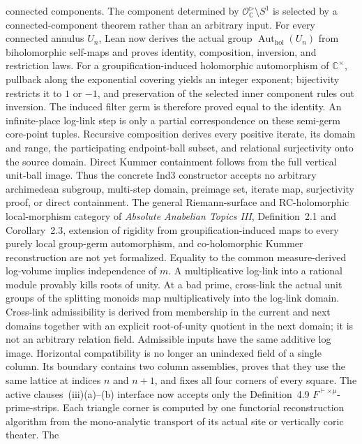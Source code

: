 \begin{definition}
  connected components.  The component determined by
  \(\mathcal O^{\triangleright}_{\mathbb C}\setminus S^1\) is selected by a
  connected-component theorem rather than an arbitrary input.  For every
  connected annulus \(U_n\), Lean now derives the actual group
  \(\operatorname{Aut}_{\mathrm{hol}}(U_n)\) from biholomorphic self-maps and
  proves identity, composition, inversion, and restriction laws.  For a
  groupification-induced holomorphic automorphism of \(\mathbb C^\times\),
  pullback along the exponential covering yields an integer exponent;
  bijectivity restricts it to \(1\) or \(-1\), and preservation of the selected
  inner component rules out inversion.  The induced filter germ is therefore
  proved equal to the identity.  An infinite-place log-link step is only a
  partial correspondence on these semi-germ core-point tuples.
  Recursive composition derives every positive iterate, its domain and range,
  the participating endpoint-ball subset, and relational surjectivity onto the
  source domain.  Direct Kummer containment follows from the full vertical
  unit-ball image.  Thus the concrete Ind3 constructor accepts no arbitrary
  archimedean subgroup, multi-step domain, preimage set, iterate map,
  surjectivity proof, or direct containment.  The general Riemann-surface and
  RC-holomorphic local-morphism category of
  \emph{Absolute Anabelian Topics III}, Definition~2.1 and Corollary~2.3,
  extension of rigidity from groupification-induced maps to every purely local
  group-germ automorphism, and co-holomorphic Kummer reconstruction are not yet
  formalized.  Equality to the common
  measure-derived log-volume implies independence of \(m\).  A multiplicative log-link into
  a rational module provably kills roots of unity.  At a bad prime, cross-link
  the actual unit groups of the splitting monoids map multiplicatively into
  the log-link domain.  Cross-link admissibility is derived from membership in
  the current and next domains together with an explicit root-of-unity quotient
  in the next domain; it is not an arbitrary relation field.  Admissible inputs
  have the same additive log image.
  Horizontal compatibility is no longer an unindexed field of a single
  column.  Its boundary contains two column assemblies, proves that they use
  the same lattice at indices \(n\) and \(n+1\), and fixes all four corners of
  every square.  The active clauses~(iii)(a)--(b) interface now accepts only
  the Definition~4.9 \(F^{\vdash\times\mu}\)-prime-strips.  Each triangle
  corner is computed by one functorial reconstruction algorithm from the
  mono-analytic transport of its actual site or vertically coric theater.  The

\end{definition}
